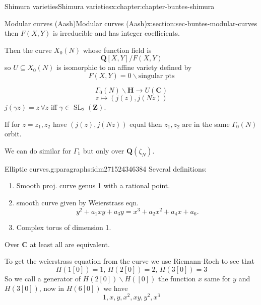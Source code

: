 \documentclass[oneside,10pt,]{book}
\numberwithin{equation}{section}
\newcommand{\lb}{[}
\newcommand{\rb}{]}
\newcommand{\ZZ}{\mathbf{Z}}
\newcommand{\QQ}{\mathbf{Q}}
\newcommand{\CC}{\mathbf{C}}
\newcommand{\HH}{\mathbf{H}}
\DeclareMathOperator{\SL}{SL}
\begin{document}
\begin{chapterptx}{Shimura varieties}{}{Shimura varieties}{}{}{x:chapter:chapter-buntes-shimura}
\begin{sectionptx}{Modular curves (Aash)}{}{Modular curves (Aash)}{}{}{x:section:sec-buntes-modular-curves}
\begin{equation*}
\end{equation*}
then \(F(X,Y)\) is irreducible and  has integer coefficients.%
\par
Then the curve \(X_0(N)\) whose function field is%
\begin{equation*}
\QQ \lb X,Y\rb/ F(X,Y)
\end{equation*}
so \(U \subseteq X_0(N)\) is isomorphic to an affine variety defined by%
\begin{equation*}
F(X,Y) = 0 \smallsetminus \text{singular pts}
\end{equation*}
%
\par
%
\begin{equation*}
\Gamma_0(N) \backslash \HH \to U(\CC)
\end{equation*}
%
\begin{equation*}
z \mapsto (j(z), j(Nz))
\end{equation*}
\(j(\gamma z) = z\,\forall z\) iff \(\gamma \in \SL_2(\ZZ)\).%
\par
If for \(z= z_1,z_2\) have \((j(z),j(Nz))\) equal then \(z_1,z_2\) are in the same \(\Gamma_0(N)\) orbit.%
\par
We can do similar for \(\Gamma_1\) but only over \(\QQ(\zeta_N)\).%
\begin{paragraphs}{Elliptic curves.}{g:paragraphs:idm271524346384}%
Several definitions:%
\begin{enumerate}
\item{}Smooth proj. curve genus 1 with a rational point.%
\item{}smooth curve given by Weierstrass eqn.%
\begin{equation*}
y^2 + a_1xy + a_3 y =  x^3 + a_2x^2 + a_4 x + a_6\text{.}
\end{equation*}
%
\item{}Complex torus of  dimension 1.%
\end{enumerate}
%
\par
Over \(\CC\) at least all are equivalent.%
\par
To get the weierstrass equation from the curve we use Riemann-Roch to see that%
\begin{equation*}
H(1[0]) = 1,\, H(2[0]) = 2,\,H(3[0]) =3
\end{equation*}
So we call a generator of \(H(2\lb 0 \rb) \smallsetminus H(\lb 0 \rb)\) the function \(x\) same for \(y\) and \(H(3\lb 0 \rb)\), now in \(H(6 \lb 0 \rb)\) we have%
\begin{equation*}
1,x,y,x^2 ,xy,y^2,x^3
\end{equation*}

\end{paragraphs}
\end{sectionptx}
\end{chapterptx}
\end{document}
